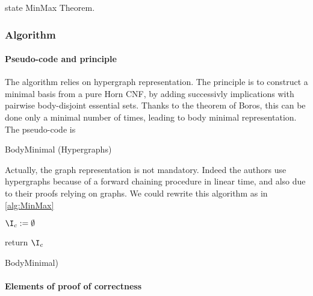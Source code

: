 state MinMax Theorem.

\subsubsection{Algorithm}

\paragraph{Pseudo-code and principle}

The algorithm relies on hypergraph representation. The principle is to construct
a minimal basis from a pure Horn CNF, by adding successivly implications with 
pairwise body-disjoint essential sets. Thanks to the theorem of Boros, this can
be done only a minimal number of times, leading to body minimal representation.
The pseudo-code is 

\begin{algorithm}
	
\caption{BodyMinimal (Hypergraphs)}
\label{alg:MinMaxHyp}
\end{algorithm}

\noindent Actually, the graph representation is not mandatory. Indeed the 
authors use hypergraphs because of a forward chaining procedure in linear time,
and also due to their proofs relying on graphs. We could rewrite this algorithm
as in \ref{alg:MinMax}

\begin{algorithm}[H]

\BlankLine
\BlankLine

$\I_c := \emptyset$ \;

return $\I_c$ \;	

\caption{BodyMinimal)}
\label{alg:MinMax}
\end{algorithm}	

\paragraph{Elements of proof of correctness}

